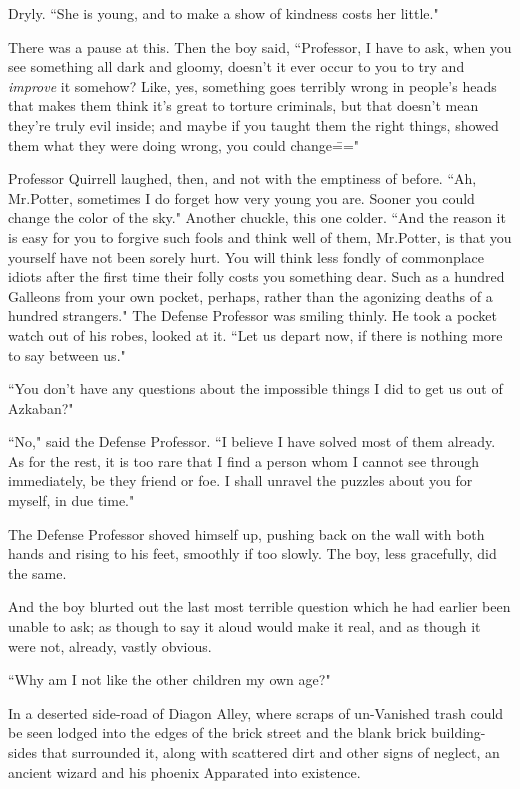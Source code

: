 Dryly. ``She is young, and to make a show of kindness costs her little."

There was a pause at this. Then the boy said, ``Professor, I have to ask, when you see something all dark and gloomy, doesn't it ever occur to you to try and \emph{improve} it somehow? Like, yes, something goes terribly wrong in people's heads that makes them think it's great to torture criminals, but that doesn't mean they're truly evil inside; and maybe if you taught them the right things, showed them what they were doing wrong, you could change\==="

Professor Quirrell laughed, then, and not with the emptiness of before. ``Ah, Mr.\?Potter, sometimes I do forget how very young you are. Sooner you could change the color of the sky." Another chuckle, this one colder. ``And the reason it is easy for you to forgive such fools and think well of them, Mr.\?Potter, is that you yourself have not been sorely hurt. You will think less fondly of commonplace idiots after the first time their folly costs you something dear. Such as a hundred Galleons from your own pocket, perhaps, rather than the agonizing deaths of a hundred strangers." The Defense Professor was smiling thinly. He took a pocket watch out of his robes, looked at it. ``Let us depart now, if there is nothing more to say between us."

``You don't have any questions about the impossible things I did to get us out of Azkaban?"

``No," said the Defense Professor. ``I believe I have solved most of them already. As for the rest, it is too rare that I find a person whom I cannot see through immediately, be they friend or foe. I shall unravel the puzzles about you for myself, in due time."

The Defense Professor shoved himself up, pushing back on the wall with both hands and rising to his feet, smoothly if too slowly. The boy, less gracefully, did the same.

And the boy blurted out the last most terrible question which he had earlier been unable to ask; as though to say it aloud would make it real, and as though it were not, already, vastly obvious.

``Why am I not like the other children my own age?"

\later

In a deserted side-road of Diagon Alley, where scraps of un-Vanished trash could be seen lodged into the edges of the brick street and the blank brick building-sides that surrounded it, along with scattered dirt and other signs of neglect, an ancient wizard and his phoenix Apparated into existence.

